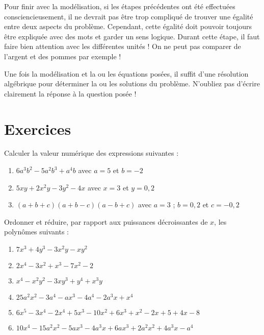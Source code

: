 Pour finir avec la modélisation, si les étapes précédentes ont été effectuées consciencieusement, il ne devrait pas être trop compliqué de trouver une égalité entre deux aspects du problème. Cependant, cette égalité doit pouvoir toujours être expliquée avec des mots et garder un sens logique. Durant cette étape, il faut faire bien attention avec les différentes unités ! On ne peut pas comparer de l'argent et des pommes par exemple !

Une fois la modélisation et la ou les équations posées, il suffit d'une résolution algébrique pour déterminer la ou les solutions du problème. N'oubliez pas d'écrire clairement la réponse à la question posée !

\section{Exercices}

\begin{exercice}
Calculer la valeur numérique des expressions suivantes :
\begin{enumerate}
\item $6{{a}^{3}}{{b}^{2}}-5{{a}^{2}}{{b}^{3}}+{{a}^{4}}b$	avec $a=5$ et $b=-2$
\item $5xy+2{{x}^{2}}y-3{{y}^{2}}-4x$	avec $x=3$ et $y=0,2$
\item $\left( a+b+c \right)\left( a+b-c \right)\left( a-b+c \right)$	avec $a=3$ ; $b=0,2$ et $c=-0,2$
\end{enumerate}
\end{exercice}

\begin{exercice}
Ordonner et réduire, par rapport aux puissances décroissantes de $x$, les polynômes suivants :
\begin{enumerate}
\item $7{{x}^{3}}+4{{y}^{3}}-3{{x}^{2}}y-x{{y}^{2}}$
\item $2{{x}^{4}}-3{{x}^{2}}+{{x}^{3}}-7{{x}^{2}}-2$
\item ${{x}^{4}}-{{x}^{2}}{{y}^{2}}-3x{{y}^{3}}+{{y}^{4}}+{{x}^{3}}y$	
\item $25{{a}^{2}}{{x}^{2}}-3{{a}^{4}}-a{{x}^{3}}-4{{a}^{4}}-2{{a}^{3}}x+{{x}^{4}}$
\item $6{{x}^{5}}-3{{x}^{4}}-2{{x}^{4}}+5{{x}^{3}}-10{{x}^{2}}+6{{x}^{3}}+{{x}^{2}}-2x+5+4x-8$
\item $10{{x}^{4}}-15{{a}^{2}}{{x}^{2}}-5a{{x}^{3}}-4{{a}^{3}}x+6a{{x}^{3}}+2{{a}^{2}}{{x}^{2}}+4{{a}^{3}}x-{{a}^{4}}$
\end{enumerate}
\end{exercice}

